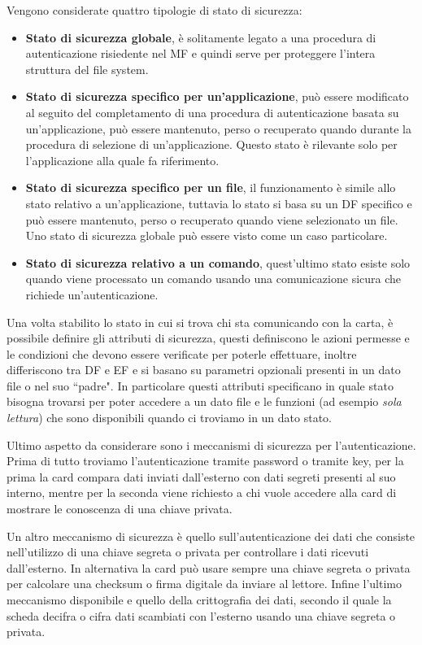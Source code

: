Vengono considerate quattro tipologie di stato di sicurezza:
\begin{itemize}
    \item \textbf{Stato di sicurezza globale}, è solitamente legato a una procedura di autenticazione risiedente nel MF e quindi serve per proteggere l'intera struttura del file system.
    \item \textbf{Stato di sicurezza specifico per un'applicazione}, può essere modificato al seguito del completamento di una procedura di autenticazione basata su un'applicazione, può essere mantenuto, perso o recuperato quando durante la procedura di selezione di un'applicazione. Questo stato è rilevante solo per l'applicazione alla quale fa riferimento.
    \item \textbf{Stato di sicurezza specifico per un file}, il funzionamento è simile allo stato relativo a un'applicazione, tuttavia lo stato si basa su un DF specifico e può essere mantenuto, perso o recuperato quando viene selezionato un file. Uno stato di sicurezza globale può essere visto come un caso particolare.
    \item \textbf{Stato di sicurezza relativo a un comando}, quest'ultimo stato esiste solo quando viene processato un comando usando una comunicazione sicura che richiede un'autenticazione.
\end{itemize}

Una volta stabilito lo stato in cui si trova chi sta comunicando con la carta, è possibile definire gli attributi di sicurezza, questi definiscono le azioni permesse e le condizioni che devono essere verificate per poterle effettuare, inoltre differiscono tra DF e EF e si basano su parametri opzionali presenti in un dato file o nel suo ``padre". In particolare questi attributi specificano in quale stato bisogna trovarsi per poter accedere a un dato file e le funzioni (ad esempio \textit{sola lettura}) che sono disponibili quando ci troviamo in un dato stato.

Ultimo aspetto da considerare sono i meccanismi di sicurezza per l'autenticazione. Prima di tutto troviamo l'autenticazione tramite password o tramite key, per la prima la card compara dati inviati dall'esterno con dati segreti presenti al suo interno, mentre per la seconda viene richiesto a chi vuole accedere alla card di mostrare le conoscenza di una chiave privata.

Un altro meccanismo di sicurezza è quello sull'autenticazione dei dati che consiste nell'utilizzo di una chiave segreta o privata per controllare i dati ricevuti dall'esterno. In alternativa la card può usare sempre una chiave segreta o privata per calcolare una checksum o firma digitale da inviare al lettore. Infine l'ultimo meccanismo disponibile e quello della crittografia dei dati, secondo il quale la scheda decifra o cifra dati scambiati con l'esterno usando una chiave segreta o privata.

